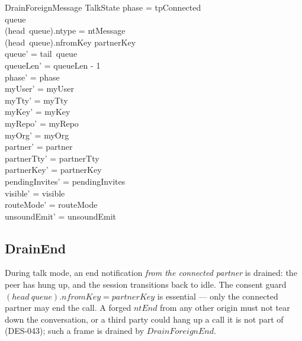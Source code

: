 \documentclass[a4paper,10pt,fleqn]{article}
\begin{document}
\begin{schema}{DrainForeignMessage}
  \Delta TalkState
\where
  phase = tpConnected \\
  queue \neq \langle \rangle \\
  (head~queue).ntype = ntMessage \\
  (head~queue).nfromKey \neq partnerKey \\
  queue' = tail~queue \\
  queueLen' = queueLen - 1 \\
  phase' = phase \\
  myUser' = myUser \\
  myTty' = myTty \\
  myKey' = myKey \\
  myRepo' = myRepo \\
  myOrg' = myOrg \\
  partner' = partner \\
  partnerTty' = partnerTty \\
  partnerKey' = partnerKey \\
  pendingInvites' = pendingInvites \\
  visible' = visible \\
  routeMode' = routeMode \\
  unsoundEmit' = unsoundEmit
\end{schema}

\subsection{DrainEnd}

During talk mode, an end notification \emph{from the connected
partner} is drained: the peer has hung up, and the session transitions
back to idle.  The consent guard $(head~queue).nfromKey = partnerKey$
is essential --- only the connected partner may end the call.  A forged
$ntEnd$ from any other origin must not tear down the conversation, or a
third party could hang up a call it is not part of (DES-043); such a
frame is drained by $DrainForeignEnd$.
\end{document}
